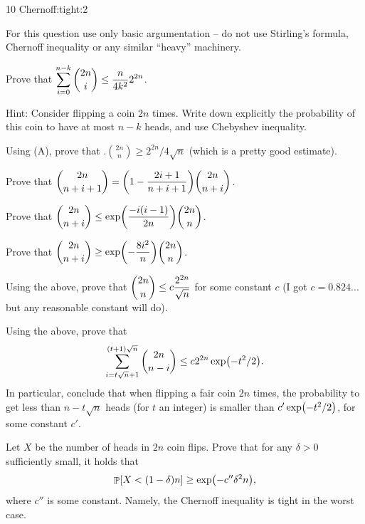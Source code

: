 %
{10}%
{Chernoff:tight:2}%
{%
   \leavevmode\hfill\break\noindent
   For this question use only basic argumentation -- do not use
   Stirling's formula, Chernoff inequality or any similar ``heavy''
   machinery.
   \begin{compactenumA}
        \item Prove that $\displaystyle \sum_{i=0}^{n - k} \binom{2n}{i} \leq
        \frac{n}{4k^2} 2^{2n}$.

        Hint: Consider flipping a coin $2n$ times. Write down
        explicitly the probability of this coin to have at most $n-k$
        heads, and use Chebyshev inequality.

        \item Using (A), prove that $\Bigg. \binom{2n}{n} \geq
        2^{2n}/4 \sqrt{n}$ (which is a pretty good estimate).

        \item Prove that $\ds \binom{2n}{n + i + 1} = \pth{ 1-
           \frac{2i+1}{n+i+1}} \binom{2n}{n+i}$.

        \item Prove that $\ds \binom{2n}{n + i}\leq \exp\pth{ \frac{-
              i(i-1)}{2n}} \binom{2n}{n}$.

        \item Prove that $\ds \binom{2n}{n + i} \geq \exp\pth{ -\frac{
              8 i^2}{n}} \binom{2n}{n}$.

        \item Using the above, prove that $\displaystyle \binom{2n}{n} \leq c
        \frac{2^{2n}}{\sqrt{n}}$ for some constant $c$ (I got $c
        =0.824...$ but any reasonable constant will do).

        \item Using the above, prove that
        \[
        \sum_{i=t\sqrt{n} + 1}^{(t+1)\sqrt{n}} \binom{2n}{n - i} \leq
        c 2^{2n} \exp \pth{-t^2/ 2}.
        \]
        In particular, conclude that when flipping a fair coin $2n$
        times, the probability to get less than $n - t\sqrt{n}$ heads
        (for $t$ an integer) is smaller than $c' \exp \pth{-t^2/2}$,
        for some constant $c'$.

        \medskip

        \item Let $X$ be the number of heads in $2n$ coin flips.  Prove
        that for any $\delta >0$ sufficiently small, it holds that
        \[
            \Prob{ X < (1- \delta) n} \geq \exp \pth{-c''\delta^2 n },
        \]
        where $c''$ is some constant. Namely, the Chernoff inequality is
        tight in the worst case.
    \end{compactenumA}
 }{}


